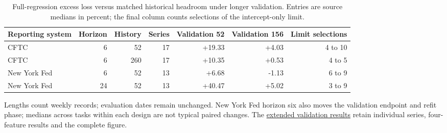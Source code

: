 \begin{table}[htbp]\centering\small
\caption{Full-regression excess loss versus matched historical headroom under longer validation. Entries are source medians in percent; the final column counts selections of the intercept-only limit.}\label{tab:v13-validation}
\begin{tabular}{lrrrrrr}\toprule
Reporting system & Horizon & History & Series & Validation 52 & Validation 156 & Limit selections\\\midrule
CFTC & 6 & 52 & 17 & +19.33 & +4.03 & 4 to 10 \\
CFTC & 6 & 260 & 17 & +10.35 & +0.53 & 4 to 5 \\
New York Fed & 6 & 52 & 13 & +6.68 & -1.13 & 6 to 9 \\
New York Fed & 24 & 52 & 13 & +40.47 & +5.02 & 3 to 9 \\
\bottomrule\end{tabular}
\par\vspace{2pt}\begin{minipage}{.98\linewidth}\footnotesize
Lengths count weekly records; evaluation dates remain unchanged. New York Fed horizon six also moves the validation endpoint and refit phase; medians across tasks within each design are not typical paired changes.
The \href{https://github.com/ByronLi0207/financial-mathematics-paper-20261020/blob/submission-final/EXTENDED_RESULTS.md#asmbi-extended-s38}{extended validation results} retain individual series, four-feature results and the complete figure.
\end{minipage}\end{table}
